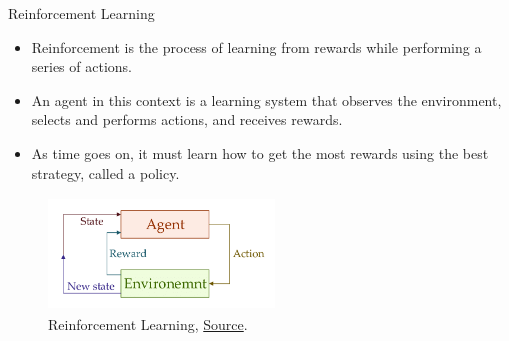 \documentclass[compress,oilve]{beamer}
\begin{document}
\begin{frame}{Reinforcement Learning}
\begin{itemize}
	\item Reinforcement is the process of learning from rewards while performing a series of actions.
	
	\item An agent in this context is a learning system that observes the environment, selects and performs actions, and receives rewards. 
	
	\item As time goes on, it must learn how to get the most rewards using the best strategy, called a policy.
	
\end{itemize}

	\begin{figure}
		 \centering
		 \includegraphics[width=6cm, height=3cm]{Figs/6.png}  
		 \caption{Reinforcement Learning, \href{https://tinyurl.com/2f6plway}{Source}.}
	\end{figure}

\end{frame}
\end{document}
